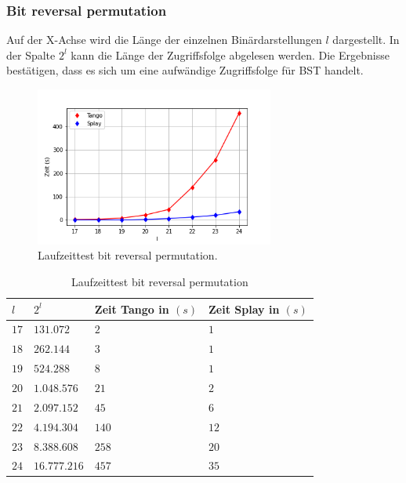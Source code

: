 \documentclass[a4paper,12pt]{article}
\begin{document}
\subsubsection{Bit reversal permutation}
Auf der X-Achse wird die Länge der einzelnen Binärdarstellungen $l$ dargestellt. In der Spalte $2^l$ kann die Länge der Zugriffsfolge abgelesen werden. Die Ergebnisse bestätigen, dass es sich um eine aufwändige Zugriffsfolge für BST handelt.
\begin{figure}[H]
	\centering
	\includegraphics[width=0.7\textwidth]{"Medien/laufzeittest/diagramm/brp"}
	\caption{Laufzeittest bit reversal permutation.}
	\label{fig:ResultGUI}
\end{figure}
 \begin{table}[H]
	\begin{center}
		\begin{tabular}[c]{|l|l|l|l|}
			\hline
			$l$ & $2^l$ &Zeit Tango in $\left(s\right)$ &Zeit Splay in $\left(s\right)$ \\
			\hline
			$17$ &	$131.072 $ &$2$ &$1$ \\
			\hline
			$18$  &$262.144 $ &$3$ &$1$  \\
			\hline
			$19$  &$524.288 $ &$8$ &$1$  \\
			\hline
			$20$  &$1.048.576 $ &$21$ &$2$  \\
			\hline
			$21$  &$2.097.152 $ &$45$ &$6$  \\
			\hline
			$22$  &$4.194.304 $ &$140$ &$12$  \\
			\hline
			$23$  &$8.388.608 $ &$258$ &$20$  \\
			\hline
			$24$  &$16.777.216$ &$457$ &$35$  \\
			\hline
		\end{tabular}
		\caption{Laufzeittest bit reversal permutation} 
	\end{center}
\end{table}
\end{document}
